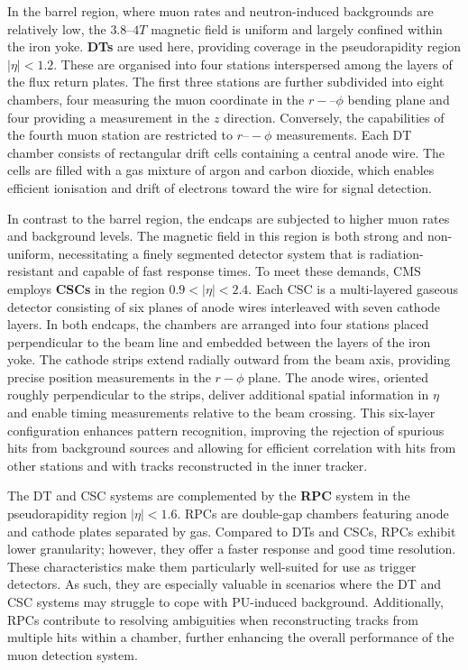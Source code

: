 In the barrel region, where muon rates and neutron-induced backgrounds are relatively low, the $3.8–4\unit{T}$ magnetic field is uniform and largely confined within the iron yoke. \textbf{\ac{DTs}} are used here, providing coverage in the pseudorapidity region $|\eta| < 1.2$. These are organised into four stations interspersed among the layers of the flux return plates. The first three stations are further subdivided into eight chambers, four measuring the muon coordinate in the $r-–\phi$ bending plane and four providing a measurement in the $z$ direction. Conversely, the capabilities of the fourth muon station are restricted to $r–-\phi$ measurements. Each DT chamber consists of rectangular drift cells containing a central anode wire. The cells are filled with a gas mixture of argon and carbon dioxide, which enables efficient ionisation and drift of electrons toward the wire for signal detection. 

In contrast to the barrel region, the endcaps are subjected to higher muon rates and background levels. The magnetic field in this region is both strong and non-uniform, necessitating a finely segmented detector system that is radiation-resistant and capable of fast response times. To meet these demands, CMS employs \textbf{\ac{CSCs}} in the region $0.9 < |\eta|<2.4$. Each CSC is a multi-layered gaseous detector consisting of six planes of anode wires interleaved with seven cathode layers. In both endcaps, the chambers are arranged into four stations placed perpendicular to the beam line and embedded between the layers of the iron yoke. The cathode strips extend radially outward from the beam axis, providing precise position measurements in the $r-\phi$ plane. The anode wires, oriented roughly perpendicular to the strips, deliver additional spatial information in $\eta$ and enable timing measurements relative to the beam crossing. This six-layer configuration enhances pattern recognition, improving the rejection of spurious hits from background sources and allowing for efficient correlation with hits from other stations and with tracks reconstructed in the inner tracker.

The DT and CSC systems are complemented by the \textbf{\ac{RPC}} system in the pseudorapidity region $|\eta| < 1.6$. RPCs are double-gap chambers featuring anode and cathode plates separated by gas. Compared to DTs and CSCs, RPCs exhibit lower granularity; however, they offer a faster response and good time resolution. These characteristics make them particularly well-suited for use as trigger detectors. As such, they are especially valuable in scenarios where the DT and CSC systems may struggle to cope with PU-induced background. Additionally, RPCs contribute to resolving ambiguities when reconstructing tracks from multiple hits within a chamber, further enhancing the overall performance of the muon detection system.

